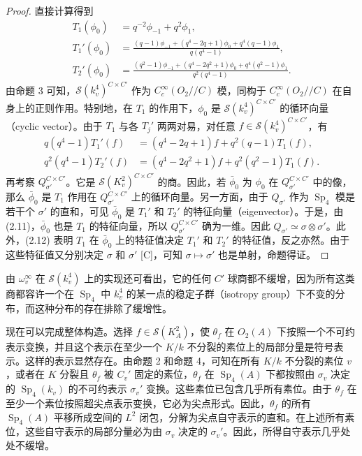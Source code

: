 \begin{proof}
直接计算得到
\begin{equation}
\begin{aligned}
 T_1(\phi_0)&=q^{-2}\phi_{-1}+q^2\phi_1,\\
 T_1'(\phi_0)&=\frac{(q-1)\phi_{-1}+(q^4-2q+1)\phi_0+q^4(q-1)\phi_1}{q(q^4-1)},\\
 T_2'(\phi_0)&=\frac{(q^2-1)\phi_{-1}+(q^4-2q^2+1)\phi_0+q^4(q^2-1)\phi_1}{q^2(q^4-1)}.
\end{aligned}\tag{2.11}
\end{equation}
由命题 3 可知，$\mathcal S(k_v^4)^{C\times C'}$ 作为 $C_c^\infty(O_2//C)$ 模，同构于 $C_c^\infty(O_2//C)$ 在自身上的正则作用。特别地，在 $T_1$ 的作用下，$\phi_0$ 是 $\mathcal S(k_v^4)^{C\times C'}$ 的循环向量（cyclic vector）。由于 $T_1$ 与各 $T_j'$ 两两对易，对任意 $f\in\mathcal S(k_v^4)^{C\times C'}$，有
\begin{equation}
\begin{aligned}
 q(q^4-1)T_1'(f)&=(q^4-2q+1)f+q^2(q-1)T_1(f),\\
 q^2(q^4-1)T_2'(f)&=(q^4-2q^2+1)f+q^2(q^2-1)T_1(f).
\end{aligned}\tag{2.12}
\end{equation}
再考察 $Q_{\sigma'}^{C\times C'}$。它是 $\mathcal S(K_v^2)^{C\times C'}$ 的商。因此，若 $\bar\phi_0$ 为 $\phi_0$ 在 $Q_{\sigma'}^{C\times C'}$ 中的像，那么 $\bar\phi_0$ 是 $T_1$ 作用在 $Q_{\sigma'}^{C\times C'}$ 上的循环向量。另一方面，由于 $Q_{\sigma'}$ 作为 $\operatorname{Sp}_4$ 模是若干个 $\sigma'$ 的直和，可见 $\bar\phi_0$ 是 $T_1'$ 和 $T_2'$ 的特征向量（eigenvector）。于是，由 (2.11)，$\bar\phi_0$ 也是 $T_1$ 的特征向量，所以 $Q_{\sigma'}^{C\times C'}$ 确为一维。因此 $Q_{\sigma'}\simeq\sigma\otimes\sigma'$。此外，(2.12) 表明 $T_1$ 在 $\bar\phi_0$ 上的特征值决定 $T_1'$ 和 $T_2'$ 的特征值，反之亦然。由于这些特征值又分别决定 $\sigma$ 和 $\sigma'$ [C]，可知 $\sigma\mapsto\sigma'$ 也是单射，命题得证。
\end{proof}

由 $\omega_v^\infty$ 在 $\mathcal S(k_v^4)$ 上的实现还可看出，它的任何 $C'$ 球商都不缓增，因为所有这类商都容许一个在 $\operatorname{Sp}_4$ 中 $k_v^4$ 的某一点的稳定子群（isotropy group）下不变的分布，而这种分布的存在排除了缓增性。

现在可以完成整体构造。选择 $f\in\mathcal S(K_A^2)$，使 $\theta_f$ 在 $O_2(A)$ 下按照一个不可约表示变换，并且这个表示在至少一个 $K/k$ 不分裂的素位上的局部分量是符号表示。这样的表示显然存在。由命题 2 和命题 4，可知在所有 $K/k$ 不分裂的素位 $v$，或者在 $K$ 分裂且 $\theta_f$ 被 $C_v'$ 固定的素位，$\theta_f$ 在 $\operatorname{Sp}_4(A)$ 下都按照由 $\sigma_v$ 决定的 $\operatorname{Sp}_4(k_v)$ 的不可约表示 $\sigma_v'$ 变换。这些素位已包含几乎所有素位。由于 $\theta_f$ 在至少一个素位按照超尖点表示变换，它必为尖点形式。因此，$\theta_f$ 的所有 $\operatorname{Sp}_4(A)$ 平移所成空间的 $L^2$ 闭包，分解为尖点自守表示的直和。在上述所有素位，这些自守表示的局部分量必为由 $\sigma_v$ 决定的 $\sigma_v'$。因此，所得自守表示几乎处处不缓增。

